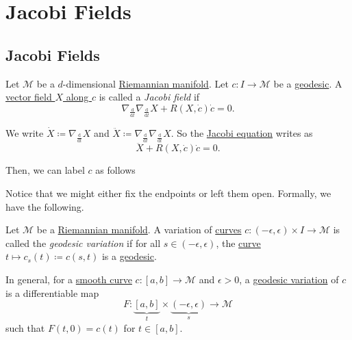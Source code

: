 \chapter{Jacobi Fields}

\section{Jacobi Fields}

\begin{definition}\label{def:Jacobi-field}
	Let \(\mathcal{M} \) be a \(d\)-dimensional \hyperref[def:Riemannian-manifold]{Riemannian manifold}. Let \(c\colon I \to \mathcal{M} \) be a \hyperref[def:geodesic]{geodesic}. A \hyperref[def:vector-field-along-curve]{vector field \(X\) along \(c\)} is called a \emph{Jacobi field} if
	\begin{equation}\label{eq:Jacobi}
		\nabla _{\frac{\mathrm{d}}{\mathrm{d}t} }\nabla _{\frac{\mathrm{d}}{\mathrm{d}t} }X + R(X, \dot{c} )\dot{c} = 0.
	\end{equation}
\end{definition}

\begin{notation}
	We write \(\dot{X} \coloneqq \nabla _{\frac{\mathrm{d}}{\mathrm{d}t} }X\) and \(\ddot{X} \coloneqq \nabla _{\frac{\mathrm{d}}{\mathrm{d}t} } \nabla _{\frac{\mathrm{d}}{\mathrm{d}t} } X\). So the \hyperref[eq:Jacobi]{Jacobi equation} writes as
	\[
		\ddot{X} + R (X, \dot{c} ) \dot{c} = 0.
	\]
\end{notation}

Then, we can label \(c\) as follows
\begin{center}
\end{center}
Notice that we might either fix the endpoints or left them open. Formally, we have the following.

\begin{definition}\label{def:geodesic-variation}
	Let \(\mathcal{M} \) be a \hyperref[def:Riemannian-manifold]{Riemannian manifold}. A variation of \hyperref[def:curve]{curves} \(c\colon (-\epsilon , \epsilon )\times I \to \mathcal{M} \) is called the \emph{geodesic variation} if for all \(s\in (-\epsilon , \epsilon )\), the \hyperref[def:curve]{curve} \(t\mapsto c_s(t) \coloneqq c(s, t)\) is a \hyperref[def:geodesic]{geodesic}.
\end{definition}

In general, for a \hyperref[def:curve]{smooth curve} \(c\colon [a, b] \to \mathcal{M} \) and \(\epsilon > 0\), a \hyperref[def:geodesic-variation]{geodesic variation} of \(c\) is a differentiable map
\[
	F\colon \underbrace{[a, b]}_{t} \times \underbrace{(-\epsilon , \epsilon )}_{s} \to \mathcal{M}
\]
such that \(F(t, 0) = c(t)\) for \(t\in [a, b]\).

